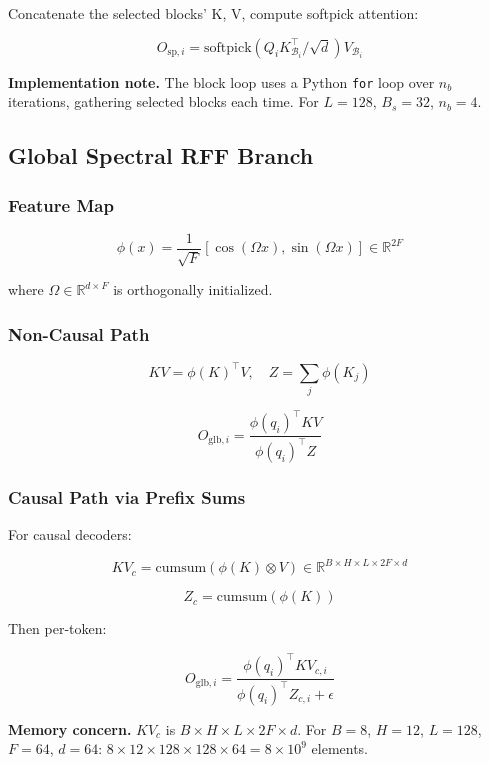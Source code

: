 Concatenate the selected blocks' K, V, compute softpick attention:

\[
O_{\text{sp}, i} = \text{softpick}(Q_i K_{\mathcal{B}_i}^\top / \sqrt{d}) V_{\mathcal{B}_i}
\tag{4.6}
\]

\textbf{Implementation note.} The block loop uses a Python \texttt{for} loop over 
$n_b$ iterations, gathering selected blocks each time. For $L = 128$, 
$B_s = 32$, $n_b = 4$.

\subsection{Global Spectral RFF Branch}

\subsubsection{Feature Map}

\[
\phi(x) = \frac{1}{\sqrt{F}} [\cos(\Omega x), \sin(\Omega x)] \in \mathbb{R}^{2F}
\tag{4.7}
\]

where $\Omega \in \mathbb{R}^{d \times F}$ is orthogonally initialized.

\subsubsection{Non-Causal Path}

\[
KV = \phi(K)^\top V, \quad Z = \sum_j \phi(K_j)
\tag{4.8}
\]

\[
O_{\text{glb}, i} = \frac{\phi(q_i)^\top KV}{\phi(q_i)^\top Z}
\tag{4.9}
\]

\subsubsection{Causal Path via Prefix Sums}

For causal decoders:

\[
KV_c = \text{cumsum}(\phi(K) \otimes V) \in \mathbb{R}^{B \times H \times L \times 2F \times d}
\tag{4.10}
\]

\[
Z_c = \text{cumsum}(\phi(K))
\tag{4.11}
\]

Then per-token:

\[
O_{\text{glb}, i} = \frac{\phi(q_i)^\top KV_{c,i}}{\phi(q_i)^\top Z_{c,i} + \epsilon}
\tag{4.12}
\]

\textbf{Memory concern.} $KV_c$ is $B \times H \times L \times 2F \times d$. For 
$B = 8$, $H = 12$, $L = 128$, $F = 64$, $d = 64$: 
$8 \times 12 \times 128 \times 128 \times 64 = 8 \times 10^9$ elements.

